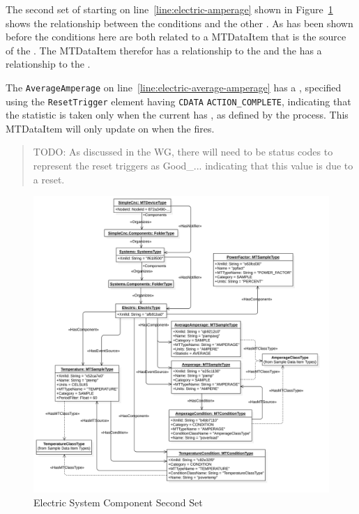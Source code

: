 The second set of  starting on line~\ref{line:electric-amperage} shown in Figure~\ref{fig:electric-system-2} shows the relationship between the conditions and the other . As has been shown before the conditions here are both related to a \gls{MTDataItem} that is the source of the . The \gls{MTDataItem} therefor has a  relationship to the  and the  has a  relationship to the . 

The \texttt{AverageAmperage} on line~\ref{line:electric-average-amperage} has a , specified using the \texttt{ResetTrigger} element having \texttt{CDATA} \texttt{ACTION_COMPLETE}, indicating that the  statistic is taken only when the current  has , as defined by the process. This \gls{MTDataItem} will only update on when the  fires.

\begin{quote}
  {\color{red} TODO: As discussed in the WG, there will need to be status codes to represent the reset triggers as Good_... indicating that this value is due to a reset}.
\end{quote}

\begin{figure}[ht]
  \centering
  \includegraphics[width=1.0\textwidth]{diagrams/mtconnect-mapping/electric-system-2.png}
  \caption{Electric System Component Second Set}
  \label{fig:electric-system-2}
\end{figure}

